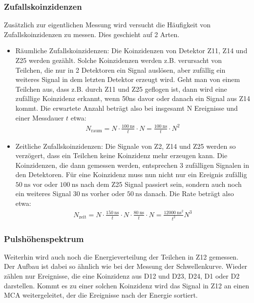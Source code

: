 \subsubsection{Zufallskoinzidenzen}
Zusätzlich zur eigentlichen Messung wird versucht die Häufigkeit von Zufallskoinzidenzen zu messen. Dies geschieht auf 2 Arten.
\begin{itemize}
	\item Räumliche Zufallskoinzidenzen: Die Koinzidenzen von Detektor Z11, Z14 und Z25 werden gezählt. Solche Koinzidenzen werden z.B. verursacht von Teilchen, die nur in 2 Detektoren ein Signal auslösen, aber zufällig ein weiteres Signal in dem letzten Detektor erzeugt wird. Geht man von einem Teilchen aus, dass z.B. durch Z11 und Z25 geflogen ist, dann wird eine zufällige Koinzidenz erkannt, wenn 50ns davor oder danach ein Signal aus Z14 kommt. Die erwartete Anzahl beträgt also bei insgesamt N Ereignisse und einer Messdauer $t$ etwa: 
\begin{align}
N_{\text{raum}} = N \cdot \frac{\SI{100}{\nano\second}}{t} \cdot N = \frac{\SI{100}{\nano\second}}{t} \cdot N^2 
\label{equ:random_space}
\end{align}

	\item Zeitliche Zufallskoinzidenzen: Die Signale von Z2, Z14 und Z25 werden so verzögert, dass ein Teilchen keine Koinzidenz mehr erzeugen kann. Die Koinzidenzen, die dann gemessen werden, entsprechen 3 zufälligen Signalen in den Detektoren. Für eine Koinzidenz muss nun nicht nur ein Ereignis zufällig $\SI{50}{\nano \second}$ vor oder $\SI{100}{\nano \second}$ nach dem Z25 Signal passiert sein, sondern auch noch ein weiteres Signal $\SI{30}{\nano \second}$ vorher oder $\SI{50}{\nano \second}$ danach. Die Rate beträgt also etwa:
	\begin{align}
N_{\text{zeit}} = N \cdot \frac{\SI{150}{\nano\second}}{t} \cdot N \cdot \frac{\SI{80}{\nano\second}}{t} \cdot N = \frac{\SI{12000}{\nano\second}^2}{t^2}N^3
\label{equ:random_time}
\end{align}

\end{itemize}

\subsubsection{Pulshöhenspektrum}
Weiterhin wird auch noch die Energieverteilung der Teilchen in Z12 gemessen. Der Aufbau ist dabei so ähnlich wie bei der Messung der Schwellenkurve. Wieder zählen nur Ereignisse, die eine Koinzidenz aus D12 und D23, D24, D1 oder D2 darstellen. Kommt es zu einer solchen Koinzidenz wird das Signal in Z12 an einen MCA weitergeleitet, der die Ereignisse nach der Energie sortiert.
